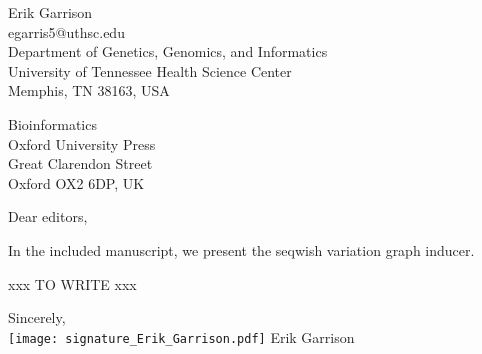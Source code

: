\documentclass[12pt,hidelinks,letterpaper]{article}
\begin{document}
    \begin{flushright}
        Erik Garrison \\
        egarris5@uthsc.edu \\
        Department of Genetics, Genomics, and Informatics \\
        University of Tennessee Health Science Center \\
        Memphis, TN 38163, USA
    \end{flushright}


    \begin{flushleft}
        Bioinformatics \\
        Oxford University Press \\
        Great Clarendon Street \\
        Oxford OX2 6DP, UK
    \end{flushleft}


    Dear editors,
    \hfill \break

    In the included manuscript, we present the seqwish variation graph inducer.

    xxx TO WRITE xxx


    \hfill \break

    \indent Sincerely,\\
    \texttt{[image: signature\_Erik\_Garrison.pdf]}
    \hfill \break
    \indent Erik Garrison

    \begin{comment}
        \hfill \break
        \begingroup
        \let\oldthebibliography\thebibliography
        \let\endoldthebibliography\endthebibliography
        \renewenvironment{thebibliography}[1]{
            \begin{oldthebibliography}{#1}
                \setlength{\itemsep}{0em}
                \setlength{\parskip}{0em}
                }
                {
            \end{oldthebibliography}
        }
        \renewcommand{\section}[2]{}%
        
        {\small }
        \endgroup
    \end{comment}
\end{document}
